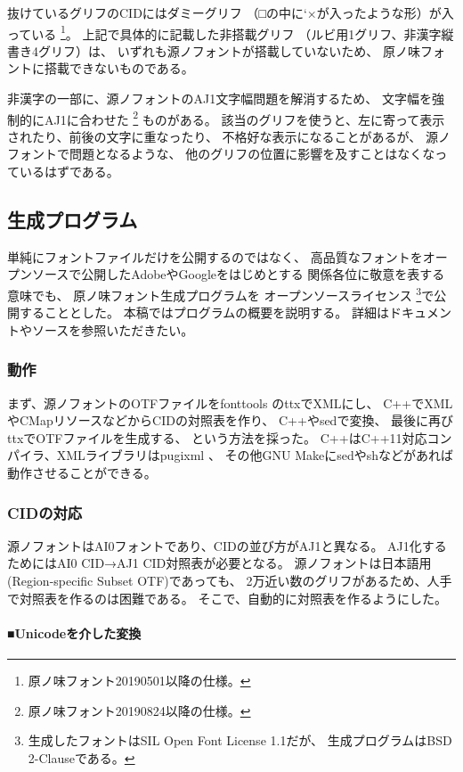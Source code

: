抜けているグリフのCIDにはダミーグリフ
（□の中に\ltjjachar`×が入ったような形）が入っている
\footnote{原ノ味フォント20190501以降の仕様。}。
上記で具体的に記載した非搭載グリフ
（ルビ用1グリフ、非漢字縦書き4グリフ）は、
いずれも源ノフォントが搭載していないため、
原ノ味フォントに搭載できないものである。

非漢字の一部に、源ノフォントのAJ1文字幅問題を解消するため、
文字幅を強制的にAJ1に合わせた
\footnote{原ノ味フォント20190824以降の仕様。}
ものがある。
該当のグリフを使うと、左に寄って表示されたり、前後の文字に重なったり、
不格好な表示になることがあるが、
源ノフォントで問題となるような、
他のグリフの位置に影響を及すことはなくなっているはずである。

\subsection{生成プログラム}

単純にフォントファイルだけを公開するのではなく、
高品質なフォントをオープンソースで公開したAdobeやGoogleをはじめとする
関係各位に敬意を表する意味でも、
原ノ味フォント生成プログラム\cite{haranoaji-generator}を
オープンソースライセンス
\footnote{生成したフォントはSIL Open Font License 1.1だが、
生成プログラムはBSD 2-Clauseである。}で公開することとした。
本稿ではプログラムの概要を説明する。
詳細はドキュメントやソースを参照いただきたい。

\subsubsection{動作}

まず、源ノフォントのOTFファイルをfonttools \cite{fonttools}のttxでXMLにし、
C++でXMLやCMapリソースなどからCIDの対照表を作り、
C++やsedで変換、
最後に再びttxでOTFファイルを生成する、
という方法を採った。
C++はC++11対応コンパイラ、XMLライブラリはpugixml \cite{pugixml}、
その他GNU Makeにsedやshなどがあれば動作させることができる。

\subsubsection{CIDの対応}

源ノフォントはAI0フォントであり、CIDの並び方がAJ1と異なる。
AJ1化するためにはAI0 CID→AJ1 CID対照表が必要となる。
源ノフォントは日本語用(Region-specific Subset OTF)であっても、
2万近い数のグリフがあるため、人手で対照表を作るのは困難である。
そこで、自動的に対照表を作るようにした。

\paragraph{■Unicodeを介した変換}

